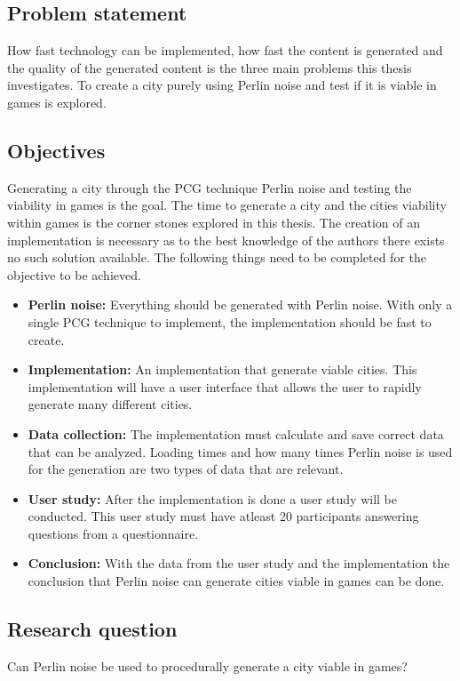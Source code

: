 	\subsection{Problem statement}
	How fast technology can be implemented, how fast the content is generated and the quality of the generated content is the three main problems this thesis investigates.
	To create a city purely using Perlin noise and test if it is viable in games is explored.
	
	\subsection{Objectives}
	Generating a city through the PCG technique Perlin noise and testing the viability in games is the goal. The time to generate a city and the cities viability within games is the corner stones explored in this thesis. The creation of an implementation is necessary as to the best knowledge of the authors there exists no such solution available.
	The following things need to be completed for the objective to be achieved.
	
	\begin{itemize}
		\item \textbf{Perlin noise:} Everything should be generated with Perlin noise.
		With only a single PCG technique to implement, the implementation should be fast to create.
		
		\item \textbf{Implementation:} An implementation that generate viable cities. This implementation will have a user interface that allows the user to rapidly generate many different cities.
		
		\item \textbf{Data collection:} The implementation must calculate and save correct data that can be analyzed. Loading times and how many times Perlin noise is used for the generation are two types of data that are relevant.
		
		\item \textbf{User study:} After the implementation is done a user study will be conducted. This user study must have atleast 20 participants answering questions from a questionnaire.
		
		\item \textbf{Conclusion: } With the data from the user study and the implementation the conclusion that Perlin noise can generate cities viable in games can be done.
	\end{itemize} 
	
	\subsection{Research question}
	Can Perlin noise be used to procedurally generate a city viable in games?

